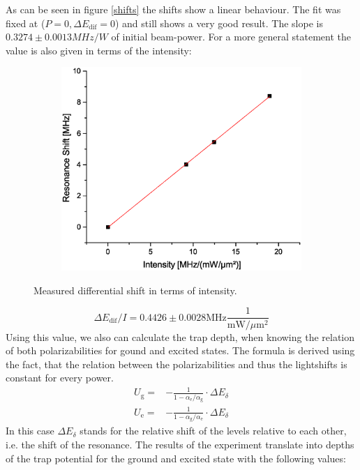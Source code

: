 As can be seen in figure \ref{shifts} the shifts show a linear behaviour. The fit was fixed at ($P=0, \Delta E_\mathrm{dif}=0$) and still shows a very good result. The slope is $0.3274\pm 0.0013\unit{MHz/W}$ of initial beam-power. For a more general statement the value is also given in terms of the intensity:
\begin{figure}[h]
\centering
\begin{subfigure}[b]{0.8\textwidth}
                \includegraphics[width=\textwidth]{shiftintens}
\end{subfigure}
\caption{Measured differential shift in terms of intensity.}
\label{shiftintens}
\end{figure}
\begin{equation}
\Delta E_\mathrm{dif}/I=0.4426\pm 0.0028\mathrm{MHz}\frac{1}{\mathrm{mW}/\mu \mathrm{m}^2}
\end{equation}
Using this value, we also can calculate the trap depth, when knowing the relation of both polarizabilities for gound and excited states. The formula is derived using the fact, that the relation between the polarizabilities and thus the lightshifts is constant for every power.
\begin{align}
U_{\mathrm{g}}=&-\frac{1}{1-\alpha_{\mathrm{e}}/\alpha_{\mathrm{g}}}\cdot \Delta E_\delta\\
U_{\mathrm{e}}=&-\frac{1}{1-\alpha_{\mathrm{g}}/\alpha_{\mathrm{e}}}\cdot \Delta E_\delta
\end{align}
In this case $\Delta E_\delta$ stands for the relative shift of the levels relative to each other, i.e. the shift of the resonance. The results of the experiment translate into depths of the trap potential for the ground and excited state with the following values:

